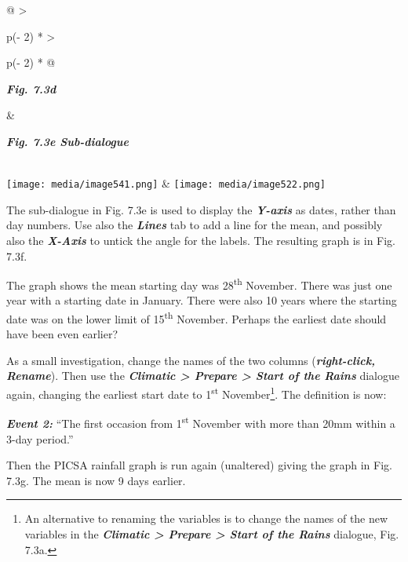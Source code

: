 \documentclass[
  letterpaper,
  DIV=11,
  numbers=noendperiod]{scrreprt}
\begin{document}
\begin{longtable}[]{@{}
  >{\raggedright\arraybackslash}p{(\columnwidth - 2\tabcolsep) * }
  >{\raggedright\arraybackslash}p{(\columnwidth - 2\tabcolsep) * }@{}}
\toprule\noalign{}
\begin{minipage}[b]{\linewidth}\raggedright
\textbf{\emph{Fig. 7.3d}}
\end{minipage} & \begin{minipage}[b]{\linewidth}\raggedright
\textbf{\emph{Fig. 7.3e Sub-dialogue}}
\end{minipage} \\
\midrule\noalign{}
\endhead
\bottomrule\noalign{}
\endlastfoot
\texttt{[image: media/image541.png]} &
\texttt{[image: media/image522.png]} \\
\end{longtable}

The sub-dialogue in Fig. 7.3e is used to display the
\textbf{\emph{Y-axis}} as dates, rather than day numbers. Use also the
\textbf{\emph{Lines}} tab to add a line for the mean, and possibly also
the \textbf{\emph{X-Axis}} to untick the angle for the labels. The
resulting graph is in Fig. 7.3f.

The graph shows the mean starting day was 28\textsuperscript{th}
November. There was just one year with a starting date in January. There
were also 10 years where the starting date was on the lower limit of
15\textsuperscript{th} November. Perhaps the earliest date should have
been even earlier?

As a small investigation, change the names of the two columns
(\textbf{\emph{right-click, Rename}}). Then use the
\textbf{\emph{Climatic \textgreater{} Prepare \textgreater{} Start of
the Rains}} dialogue again, changing the earliest start date to
1\textsuperscript{st} November\footnote{An alternative to renaming the
  variables is to change the names of the new variables in the
  \textbf{\emph{Climatic \textgreater{} Prepare \textgreater{} Start of
  the Rains}} dialogue, Fig. 7.3a.}. The definition is now:

\textbf{\emph{Event 2:}} ``The first occasion from 1\textsuperscript{st}
November with more than 20mm within a 3-day period.''

Then the PICSA rainfall graph is run again (unaltered) giving the graph
in Fig. 7.3g. The mean is now 9 days earlier.
\end{document}
